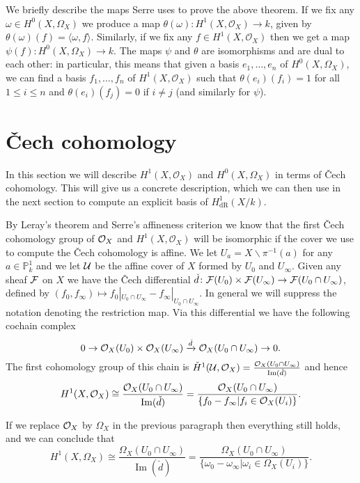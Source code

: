 \documentclass[draft, 11pt]{article} %
\theoremstyle{plain}
\theoremstyle{remark}
\newcommand{\cO}{{\cal O}}
\newcommand{\ra}{\rightarrow}
\newcommand{\cech}{\v{C}ech }
\newcommand{\hzero}{{H^0(X,\Omega_X)}}
\newcommand{\hone}{H^1(X,\mathcal{O}_X)}
\newcommand{\cechhone}{\check{H}^1(\mathcal U,\mathcal O_X)}
\newcommand{\derhamhone}{H_{\text {dR}}^1(X/k)}
\DeclareMathOperator{\Ima}{Im}
\begin{document}
We briefly describe the maps Serre uses to prove the above theorem.
If we fix any $\omega \in \hzero$ we produce a map $\theta(\omega)\colon \hone \ra k$, given by $\theta(\omega)(f) = \langle \omega , f\rangle$.
Similarly, if we fix any $f \in \hone$ then we get a map $\psi(f) \colon \hzero \ra k$.
The maps $\psi$ and $\theta$ are isomorphisms and are dual to each other: in particular, this means that given a basis $e_1, \ldots, e_n$ of $\hzero$, we can find a basis $f_1, \ldots , f_n$ of $\hone$ such that $\theta(e_i)(f_i) = 1$ for all $1 \leq i \leq n$ and $\theta(e_i)(f_j) = 0$ if $i \neq j$ (and similarly for $\psi$).


\section{\cech cohomology}
In this section we will describe $\hone$ and $\hzero$ in terms of \cech cohomology.
This will give us a concrete description, which we can then use in the next section to compute an explicit basis of $\derhamhone$.

By Leray's theorem \cite[Thm 5.2.12]{liu} and Serre's affineness criterion \cite[Thm 5.2.23]{liu} we know that the first \cech cohomology group of $\cO_X$ and $\hone$ will be isomorphic if the cover we use to compute the \cech cohomology is affine.
We let $U_a = X \backslash \pi^{-1}(a)$ for any $a \in \mathbb P_k^1$ and we let ${\cal U}$ be the affine cover of $X$ formed by $U_0$ and $U_\infty$.
Given any sheaf $\cal F$ on $X$ we have the \cech differential $\check{d}\colon {\cal F}(U_0) \times {\cal F} (U_\infty) \rightarrow {\cal F}(U_0 \cap U_\infty)$, defined by $(f_0,f_\infty) \mapsto f_0|_{U_0 \cap U_\infty} - f_\infty|_{U_0 \cap U_\infty}$.
In general we will suppress the notation denoting the restriction map.
Via this differential we have the following cochain complex
\begin{equation*}
0 \rightarrow \cO_X(U_0)\times \cO_X(U_\infty) \xrightarrow{\check{d}} \cO_X(U_0 \cap U_\infty) \rightarrow 0.
\end{equation*}
The first cohomology group of this chain is $\cechhone = \frac{\cO_X(U_0 \cap U_\infty)}{\Ima(\check{d})}$ and hence
\begin{equation}\label{cechhone}
\hone \cong \frac{\cO_X(U_0 \cap U_\infty)}{\Ima(\check{d})}  
 = \frac{\cO_X(U_0 \cap U_\infty)}{\{f_0 - f_\infty | f_i \in \cO_X(U_i) \}}.
\end{equation}

If we replace $\cO_X$ by $\Omega_X$ in the previous paragraph then everything still holds, and we can conclude that
\[
H^1(X,\Omega_X) \cong \frac{\Omega_X(U_0 \cap U_\infty)}{\Ima(\check{d})} = \frac{\Omega_X(U_0 \cap U_\infty)}{\{\omega_0 - \omega_ \infty | \omega_i \in \Omega_X(U_i)\}}.
\]
\end{document}
